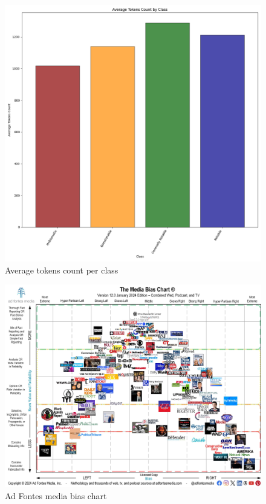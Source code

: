 \begin{figure}[htbp]
    \centering
    \includegraphics[width=0.9\linewidth]{figures/tokens_count_vx_per_class_hist.png}
    \caption{Average tokens count per class}
    \label{fig:avg_tokens_count_per_class}
\end{figure}


\begin{figure}[htbp]
    \centering
    \includegraphics[width=0.8\linewidth]{images/Media-Bias-Chart-12.0_Jan-2024-Licensed-scaled.jpg}
    \caption{Ad Fontes media bias chart}
    \label{fig:adfontes-media-bias-chart}
\end{figure}



